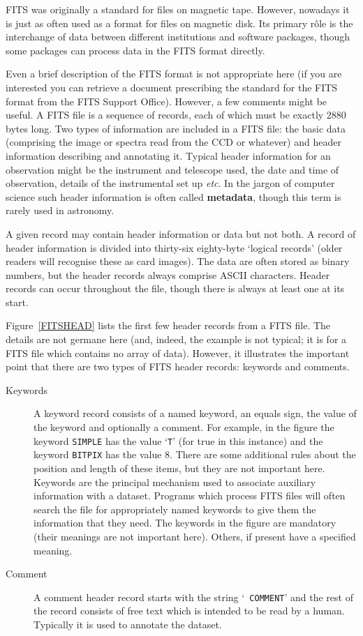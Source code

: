 \documentclass[twoside,11pt]{article}
\begin{document}
FITS was originally a standard for files on magnetic tape.  However,
nowadays it is just as often used as a format for files on magnetic disk.
Its primary r\^{o}le is the interchange of data between different
institutions and software packages, though some packages can process data
in the FITS format directly.

Even a brief description of the FITS format is not appropriate here (if
you are interested you can retrieve a document prescribing the standard
for the FITS format from the FITS Support Office).  However, a few comments
might be useful.  A FITS file is a sequence of records, each of which
must be exactly 2880 bytes long.  Two types of information are included in
a FITS file: the basic data (comprising the image or spectra read from the
CCD or whatever) and header information describing and annotating it.
Typical header information for an observation might be the instrument and
telescope used, the date and time of observation, details of the
instrumental set up \emph{etc}.  In the jargon of computer science such
header information is often called {\bf metadata}, though this term is
rarely used in astronomy.

A given record may contain header information or data but not both.  A
record of header information is divided into thirty-six eighty-byte
`logical records' (older readers will recognise these as card images).
The data are often stored as binary numbers, but the header records
always comprise ASCII characters.  Header records can occur throughout
the file, though there is always at least one at its start.

Figure~\ref{FITSHEAD} lists the first few header records from a FITS
file.  The details are not germane here (and, indeed, the example is
not typical; it is for a FITS file which contains no array of data).
However, it illustrates the important point that there are two types
of FITS header records: keywords and comments.

\begin{description}

  \item[Keywords] A keyword record consists of a named keyword, an
   equals sign, the value of the keyword and optionally a comment.  For
   example, in the figure the keyword {\tt SIMPLE} has the value `{\tt T}'
   (for true in this instance) and the keyword {\tt BITPIX} has the value
   8.  There are some additional rules about the position and length of
   these items, but they are not important here.  Keywords are the principal
   mechanism used to associate auxiliary information with a dataset.
   Programs which process FITS files will often search the file for
   appropriately named keywords to give them the information that they
   need.  The keywords in the figure are mandatory (their meanings are not
   important here).  Others, if present have a specified meaning.

  \item[Comment] A comment header record starts with the string `{\tt
   COMMENT}' and the rest of the record consists of free text which is
   intended to be read by a human.  Typically it is used to annotate the
   dataset.

\end{description}
\end{document}
